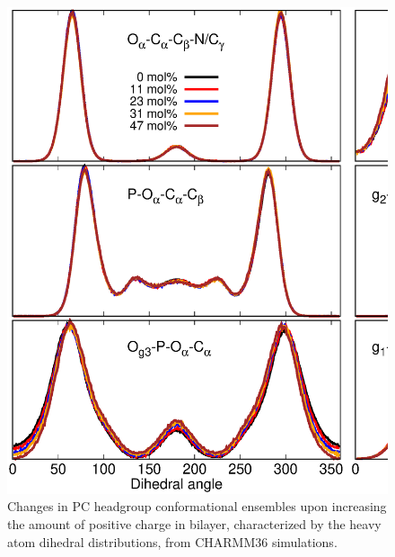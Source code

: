 \documentclass[journal=jpcbfk]{achemso}
\begin{document}
\begin{figure}[]
  \centering
  \includegraphics[width=12.0cm]{./Figs/HGorderparametersPCvsSURFdihedrals.eps}
  \caption{\label{HGorderparametersPCvsSURFdihedrals}
    Changes in PC headgroup conformational ensembles upon increasing the amount of positive charge in bilayer,
    characterized by the heavy atom dihedral distributions, from CHARMM36 simulations.
  }
\end{figure}
\end{document}
